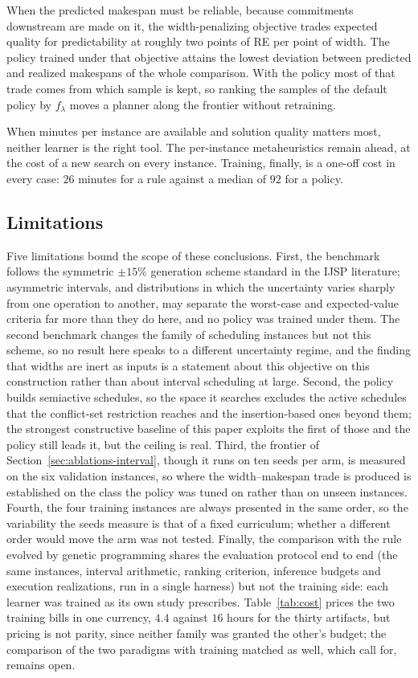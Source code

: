 \documentclass[preprint,authoryear,12pt]{elsarticle}
\theoremstyle{definition}
\theoremstyle{remark}
\begin{document}
When the predicted makespan must be reliable, because commitments
downstream are made on it, the width-penalizing objective trades
expected quality for predictability at roughly two points of RE per
point of width. The policy trained under that objective attains the
lowest deviation between predicted and realized makespans of the whole
comparison. With the policy most of that trade comes from which sample
is kept, so ranking the samples of the default policy by $f_\lambda$
moves a planner along the frontier without retraining.

When minutes per instance are available and solution quality
matters most, neither learner is the right tool. The per-instance
metaheuristics remain ahead, at the cost of a new search on every
instance. Training, finally, is a one-off cost in every case:
$26$ minutes for a rule against a median of $92$ for a policy.

\subsection{Limitations}
\label{sec:limitations}

Five limitations bound the scope of these conclusions. First, the
benchmark follows the symmetric $\pm15\%$ generation scheme standard
in the IJSP literature; asymmetric intervals, and distributions in
which the uncertainty varies sharply from one operation to another,
may separate the worst-case and expected-value criteria far more
than they do here, and no policy was trained under them. The second
benchmark changes the family of scheduling instances but not this
scheme, so no result here speaks to a different uncertainty regime,
and the finding that widths are inert as inputs is a statement about
this objective on this construction rather than about interval
scheduling at large. Second, the
policy builds semiactive schedules, so the space it searches excludes
the active schedules that the conflict-set restriction reaches and
the insertion-based ones beyond them; the strongest constructive
baseline of this paper exploits the first of those and the policy
still leads it, but the ceiling is real. Third, the frontier of Section~\ref{sec:ablations-interval}, though
it runs on ten seeds per arm, is measured on the six validation
instances, so where the width--makespan trade is produced is
established on the class the policy was tuned on rather than on
unseen instances. Fourth, the four training instances are
always presented in the same order, so the variability the seeds
measure is that of a fixed curriculum; whether a different order
would move the arm was not tested. Finally, the comparison with the rule evolved by
genetic programming shares the evaluation protocol end to end (the
same instances, interval arithmetic, ranking criterion, inference
budgets and execution realizations, run in a single harness) but not
the training side: each learner was trained as its own study
prescribes. Table~\ref{tab:cost} prices the two training bills in one
currency, $4.4$ against $16$ hours for the thirty artifacts, but
pricing is not parity, since neither family was granted the other's
budget; the comparison of the two paradigms with training matched as
well, which \citet{Xu2025} call for, remains open.
\end{document}
